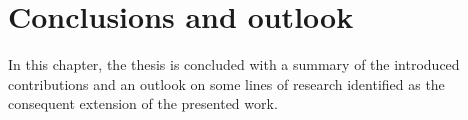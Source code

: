 
\chapter{Conclusions and outlook}
\label{chap:conclusion}
\begin{synopsis}
In this chapter, the thesis is concluded with a summary of the introduced contributions and an outlook on some lines of research identified as the consequent extension of the presented work.
\end{synopsis}
